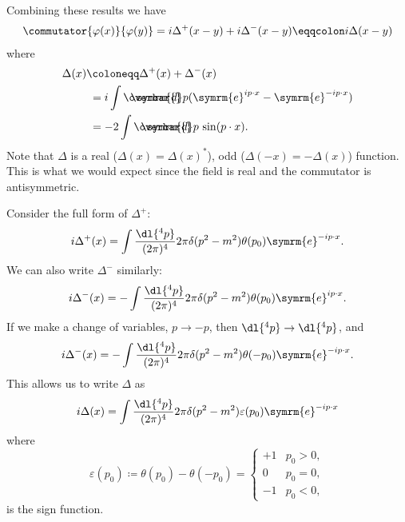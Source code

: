 \documentclass[fleqn]{NotesClass}
\newcommand{\e}{\symrm{e}}
\newcommand{\dbar}[1][0.0]{\ThisStyle{\ensurestackMath{%
            \stackengine{#1\LMex}{\SavedStyle \symrm{d}}{\SavedStyle\overbar{}%
                \mkern2.25mu}{O}{r}{F}{F}{L}}}}
\newcommand{\invariantmeasure}[1]{%
    \mathchoice{\dbar #1}{\dbar #1}{\dbar[.05] #1}{\dbar[.06] #1}
}
\newcommand{\heaviside}{\theta}
\begin{document}
    Combining these results we have
    \begin{align}
        \commutator{\varphi(x)}{\varphi(y)} = i\Delta^+(x - y) + i\Delta^-(x - y) \eqqcolon i\Delta(x - y)
    \end{align}
    where
    \begin{align}
        \Delta(x) &\coloneqq \Delta^+(x) + \Delta^-(x)\\
        &\hphantom{:}= i \int \invariantmeasure{p} (\e^{ip\cdot x} - \e^{-ip\cdot x})\\
        &\hphantom{:}= -2\int \invariantmeasure{p} \, \sin (p \cdot x).
    \end{align}
    Note that \(\Delta\) is a real (\(\Delta(x) = \Delta(x)^*\)), odd (\(\Delta(-x) = -\Delta(x)\)) function.
    This is what we would expect since the field is real and the commutator is antisymmetric.
    
    Consider the full form of \(\Delta^+\):
    \begin{equation}
        i\Delta^+(x) = \int \frac{\dl{^4p}}{(2\pi)^4} 2\pi \delta(p^2 - m^2) \heaviside(p_0) \e^{-ip\cdot x}.
    \end{equation}
    We can also write \(\Delta^-\) similarly:
    \begin{equation}
        i\Delta^-(x) = -\int \frac{\dl{^4p}}{(2\pi)^4} 2\pi \delta(p^2 - m^2) \heaviside(p_0) \e^{ip\cdot x}.
    \end{equation}
    If we make a change of variables, \(p \to -p\), then \(\dl{^4p} \to \dl{^4p}\), and
    \begin{equation}
        i\Delta^-(x) = -\int \frac{\dl{^4p}}{(2\pi)^4} 2\pi\delta(p^2 - m^2) \heaviside(-p_0) \e^{-ip\cdot x}.
    \end{equation}
    This allows us to write \(\Delta\) as
    \begin{equation}
        i\Delta(x) = \int \frac{\dl{^4p}}{(2\pi)^4} 2\pi \delta(p^2 - m^2) \varepsilon(p_0) \e^{-ip\cdot x}
    \end{equation}
    where
    \begin{equation}
        \varepsilon(p_0) \coloneqq \heaviside(p_0) - \heaviside(-p_0) = 
        \begin{cases}
            + 1 & p_0 > 0,\\
            0 & p_0 = 0,\\
            -1 & p_0 < 0,
        \end{cases}
    \end{equation}
    is the sign function.
    
\end{document}
